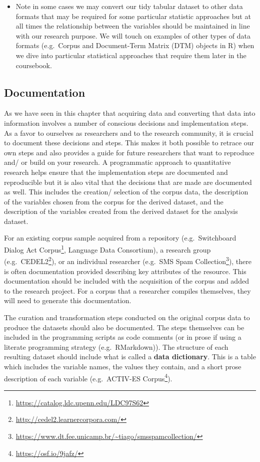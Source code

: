 \documentclass[
]{article}
\DeclareRobustCommand{\href}[2]{#2\footnote{\url{#1}}}
\newenvironment{rmdblock}[1]
  {\begin{shaded*}
  \begin{itemize}
  \renewcommand{\labelitemi}{
    \raisebox{-.5\height}[0pt][0pt]{
      {\setkeys{Gin}{width=2em,keepaspectratio}\texttt{[image: assets/images/\#1]}}
    }
  }
  \item
  }
  {
  \end{itemize}
  \end{shaded*}
  }
\newenvironment{rmdtip}
  {\begin{rmdblock}{tip}}
  {\end{rmdblock}}
\begin{document}
\begin{rmdtip}
Note in some cases we may convert our tidy tabular dataset to other data
formats that may be required for some particular statistic approaches
but at all times the relationship between the variables should be
maintained in line with our research purpose. We will touch on examples
of other types of data formats (e.g.~Corpus and Document-Term Matrix
(DTM) objects in R) when we dive into particular statistical approaches
that require them later in the coursebook.
\end{rmdtip}

\hypertarget{documentation}{%
\subsection{Documentation}\label{documentation}}

As we have seen in this chapter that acquiring data and converting that data into information involves a number of conscious decisions and implementation steps. As a favor to ourselves as researchers and to the research community, it is crucial to document these decisions and steps. This makes it both possible to retrace our own steps and also provides a guide for future researchers that want to reproduce and/ or build on your research. A programmatic approach to quantitative research helps ensure that the implementation steps are documented and reproducible but it is also vital that the decisions that are made are documented as well. This includes the creation/ selection of the corpus data, the description of the variables chosen from the corpus for the derived dataset, and the description of the variables created from the derived dataset for the analysis dataset.

For an existing corpus sample acquired from a repository (e.g.~\href{https://catalog.ldc.upenn.edu/LDC97S62}{Switchboard Dialog Act Corpus}, Language Data Consortium), a research group (e.g.~\href{http://cedel2.learnercorpora.com/}{CEDEL2}), or an individual researcher (e.g.~\href{https://www.dt.fee.unicamp.br/~tiago/smsspamcollection/}{SMS Spam Collection}), there is often documentation provided describing key attributes of the resource. This documentation should be included with the acquisition of the corpus and added to the research project. For a corpus that a researcher compiles themselves, they will need to generate this documentation.

The curation and transformation steps conducted on the original corpus data to produce the datasets should also be documented. The steps themselves can be included in the programming scripts as code comments (or in prose if using a literate programming strategy (e.g.~RMarkdown)). The structure of each resulting dataset should include what is called a \textbf{data dictionary}. This is a table which includes the variable names, the values they contain, and a short prose description of each variable (e.g.~\href{https://osf.io/9jafz/}{ACTIV-ES Corpus}).
\end{document}
